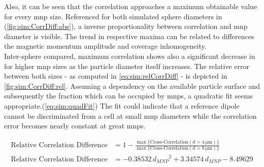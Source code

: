 Also, it can be seen that the correlation approaches a maximum obtainable value for every \gls{mnp} size. Referenced for both simulated sphere diameters in (\cref{fig:sim:CorrDiff:abs}), a inverse proportionality between correlation and \gls{mnp} diameter is visible. The trend in respective maxima can be related to differences the magnetic momentum amplitude and coverage inhomogeneity. \\ 
Inter-sphere compared, maximum correlation shows also a significant decrease in for higher \gls{mnp} sizes as the particle diameter itself increases. The relative error between both sizes - as computed in \cref{eq:sim:relCorrDiff} -  is depicted in \cref{fig:sim:CorrDiff:rel}. Assuming a dependency on the available particle surface and subsequently the fraction which can be occupied by \glspl{mnp}, a quadratic fit seems appropriate.(\cref{eq:sim:quadFit}) The fit could indicate that a reference dipole cannot be discriminated from a cell at small \gls{mnp} diameters while the correlation error becomes nearly constant at great \glspl{mnp}.

\begin{align}
	\text{Relative\ Correlation\ Difference} &= 1- \frac{\max\{\text{Cross-Correlation}(d=\SI{4}{\micro\meter})\}}{\max\{\text{Cross-Correlation}(d = \SI{8}{\micro\meter})\}} \label{eq:sim:relCorrDiff}\\
	\text{Relative\ Correlation\ Difference} &= \num{-0,38532} \, {d_{MNP}}^2 + \num{3,34574} \, d_{MNP} - \num{8,49629} \label{eq:sim:quadFit}
\end{align}



\begin{figure}
		\centering
	 \hfill
	\addtocounter{subfigure}{-1}
\label{fig:sim:CorrDiff}
\end{figure}
